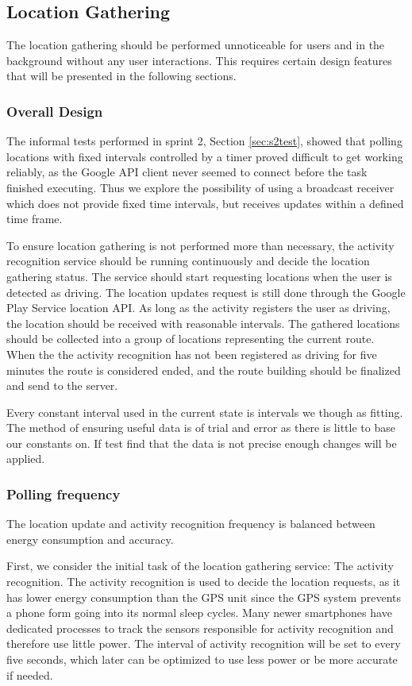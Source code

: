 \subsection{Location Gathering}\label{section:s3locgath}
The location gathering should be performed unnoticeable for users and in the background without any user interactions. 
This requires certain design features that will be presented in the following sections. 


\subsubsection{Overall Design}
The informal tests performed in sprint 2, Section \ref{sec:s2test}, showed that polling locations with fixed intervals controlled by a timer proved difficult to get working reliably, as the Google API client never seemed to connect before the task finished executing. 
Thus we explore the possibility of using a broadcast receiver which does not provide fixed time intervals, but receives updates within a defined time frame.

To ensure location gathering is not performed more than necessary, the activity recognition service should be running continuously and decide the location gathering status.
The service should start requesting locations when the user is detected as driving. 
The location updates request is still done through the Google Play Service location API.
As long as the activity registers the user as driving, the location should be received with reasonable intervals.
The gathered locations should be collected into a group of locations representing the current route.
When the the activity recognition has not been registered as driving for five minutes the route is considered ended, and the route building should be finalized and send to the server.


Every constant interval used in the current state is intervals we though as fitting.
The method of ensuring useful data is of trial and error as there is little to base our constants on.
If test find that the data is not precise enough changes will be applied.

\subsubsection{Polling frequency}
The location update and activity recognition frequency is balanced between energy consumption and accuracy.

First, we consider the initial task of the location gathering service: The activity recognition.
The activity recognition is used to decide the location requests, as it has lower energy consumption than the GPS unit \cite{fuckGPS} since the GPS system prevents a phone form going into its normal sleep cycles.
Many newer smartphones \cite{coCPU} have dedicated processes to track the sensors responsible for activity recognition and therefore use little power.
The interval of activity recognition will be set to every five seconds, which later can be optimized to use less power or be more accurate if needed.

